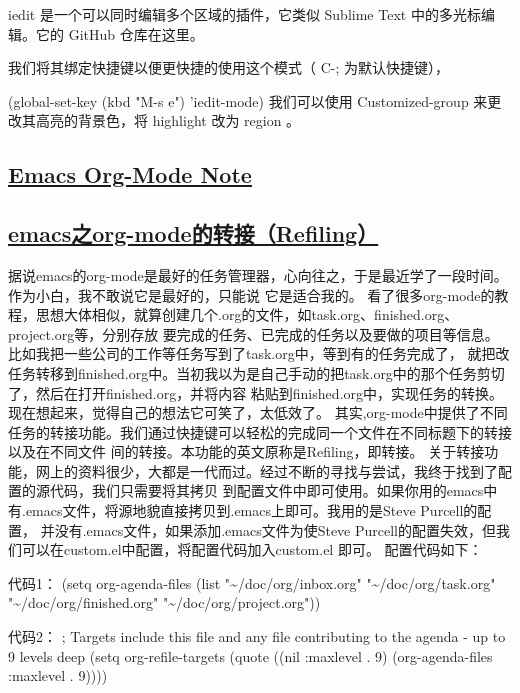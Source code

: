 \documentclass[11pt]{ctexart}
\begin{document}
iedit 是一个可以同时编辑多个区域的插件，它类似 Sublime Text 中的多光标编辑。它的 GitHub 仓库在这里。

我们将其绑定快捷键以便更快捷的使用这个模式（ C-; 为默认快捷键），

(global-set-key (kbd "M-s e") 'iedit-mode)
我们可以使用 Customized-group 来更改其高亮的背景色，将 highlight 改为 region 。
\subsection{\href{http://blog.csdn.net/pfanaya/article/details/6676307}{Emacs Org-Mode Note}}
\label{sec:org4587609}

\subsection{\href{http://blog.csdn.net/jiluben/article/details/39505203}{emacs之org-mode的转接（Refiling）}}
\label{sec:org9ac898b}
 据说emacs的org-mode是最好的任务管理器，心向往之，于是最近学了一段时间。作为小白，我不敢说它是最好的，只能说
它是适合我的。
        看了很多org-mode的教程，思想大体相似，就算创建几个.org的文件，如task.org、finished.org、project.org等，分别存放
要完成的任务、已完成的任务以及要做的项目等信息。比如我把一些公司的工作等任务写到了task.org中，等到有的任务完成了，
就把改任务转移到finished.org中。当初我以为是自己手动的把task.org中的那个任务剪切了，然后在打开finished.org，并将内容
粘贴到finished.org中，实现任务的转换。现在想起来，觉得自己的想法它可笑了，太低效了。
    其实,org-mode中提供了不同任务的转接功能。我们通过快捷键可以轻松的完成同一个文件在不同标题下的转接以及在不同文件
间的转接。本功能的英文原称是Refiling，即转接。
    关于转接功能，网上的资料很少，大都是一代而过。经过不断的寻找与尝试，我终于找到了配置的源代码，我们只需要将其拷贝
到配置文件中即可使用。如果你用的emacs中有.emacs文件，将源地貌直接拷贝到.emacs上即可。我用的是Steve Purcell的配置，
并没有.emacs文件，如果添加.emacs文件为使Steve Purcell的配置失效，但我们可以在custom.el中配置，将配置代码加入custom.el
即可。
     配置代码如下：

代码1：
(setq org-agenda-files (list "\textasciitilde{}/doc/org/inbox.org"
                             "\textasciitilde{}/doc/org/task.org"
                             "\textasciitilde{}/doc/org/finished.org"
                             "\textasciitilde{}/doc/org/project.org"))



代码2：
; Targets include this file and any file contributing to the agenda - up to 9 levels deep
(setq org-refile-targets (quote ((nil :maxlevel . 9)
                                 (org-agenda-files :maxlevel . 9))))
\end{document}
